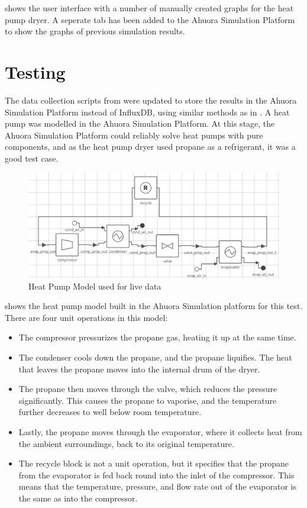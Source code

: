  shows the user interface with a number of manually created graphs for the heat pump dryer. A seperate tab has been added to the Ahuora Simulation Platform to show the graphs of previous simulation results. 


\section{Testing}

The data collection scripts from  were updated to store the results in the Ahuora Simulation Platform instead of InfluxDB, using similar methods as in . A heat pump was modelled in the Ahuora Simulation Platform. At this stage, the Ahuora Simulation Platform could reliably solve heat pumps with pure components, and as the heat pump dryer used propane as a refrigerant, it was a good test case. 


\begin{figure}
    \centering
    \includegraphics[width=\textwidth]{heatpumpmodel.png}
    \caption{Heat Pump Model used for live data}
    \label{fig:heatpumpmodel}
\end{figure}

 shows the heat pump model built in the Ahuora Simulation platform for this test. There are four unit operations in this model:

\begin{itemize}
    \item The compressor pressurizes the propane gas, heating it up at the same time. 
    \item The condenser cools down the propane, and the propane liquifies. The heat that leaves the propane moves into the internal drum of the dryer.
    \item The propane then moves through the valve, which reduces the pressure significantly. This causes the propane to vaporise, and the temperature further decreases to well below room temperature.
    \item Lastly, the propane moves through the evaporator, where it collects heat from the ambient surroundings, back to its original temperature.
    \item The recycle block is not a unit operation, but it specifies that the propane from the evaporator is fed back round into the inlet of the compressor. This means that the temperature, pressure, and flow rate out of the evaporator is the same as into the compressor.
\end{itemize}

